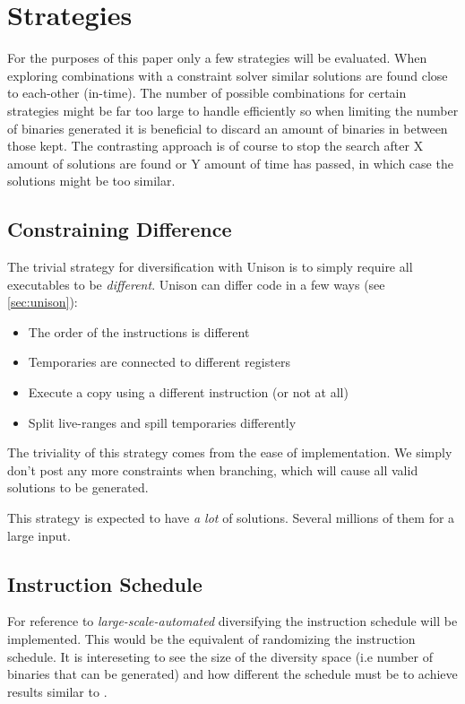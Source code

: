\section{Strategies}

For the purposes of this paper only a few strategies will be evaluated. When exploring
combinations with a constraint solver similar solutions are found close to each-other (in-time).
The number of possible combinations for certain strategies might be far too large to handle
efficiently so when limiting the number of binaries generated it is beneficial to discard
an amount of binaries in between those kept. The contrasting approach is of course to stop
the search after X amount of solutions are found or Y amount of time has passed, in which
case the solutions might be too similar.


\subsection{Constraining Difference}

The trivial strategy for diversification with Unison is to simply require all executables
to be \textit{different}. Unison can differ code in a few ways (see \ref{sec:unison}):

\begin{itemize}
	\item The order of the instructions is different
	\item Temporaries are connected to different registers
	\item Execute a copy using a different instruction (or not at all)
	\item Split live-ranges and spill temporaries differently
\end{itemize}

The triviality of this strategy comes from the ease of implementation. We simply don't post
any more constraints when branching, which will cause all valid solutions to be generated.

This strategy is expected to have \textit{a lot} of solutions. Several millions of them
for a large input.

\subsection{Instruction Schedule}

For reference to \textit{large-scale-automated} diversifying the instruction schedule will
be implemented. This would be the equivalent of randomizing the instruction schedule. It is
intereseting to see the size of the diversity space (i.e number of binaries that can be 
generated) and how different the schedule must be to achieve results similar to
\textcite{large-scale-automaed}.

